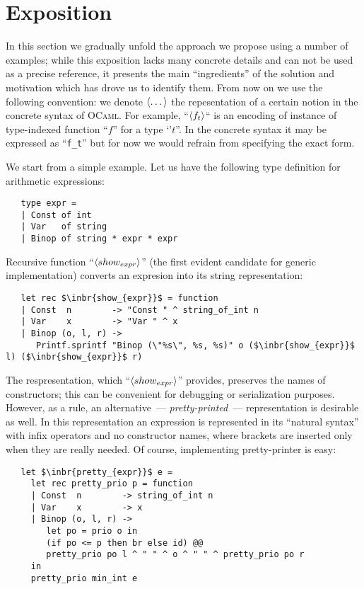\section{Exposition}

In this section we gradually unfold the approach we propose using a number of examples; while this exposition lacks many concrete details and can not be used as a
precise reference, it presents the main ``ingredients'' of the solution and motivation which has drove us to identify them. From now on we use the following
convention: we denote $\left<\dots\right>$ the repesentation of a certain notion in the concrete syntax of \textsc{OCaml}. For example, ``$\left<f_t\right>$`` is an encoding of instance
of type-indexed function ``$f$'' for a type `'$t$''. In the concrete syntax it may be expressed as ``\lstinline{f_t}'' but for now we would refrain from specifying
the exact form.

We start from a simple example. Let us have the following type definition for arithmetic expressions:

\begin{lstlisting}
   type expr =
   | Const of int
   | Var   of string
   | Binop of string * expr * expr
\end{lstlisting}

Recursive function ``$\left<show_{expr}\right>$'' (the first evident candidate for generic implementation) converts an expresion into its string representation:

\begin{lstlisting}
   let rec $\inbr{show_{expr}}$ = function
   | Const  n        -> "Const " ^ string_of_int n
   | Var    x        -> "Var " ^ x
   | Binop (o, l, r) ->
      Printf.sprintf "Binop (\"%s\", %s, %s)" o ($\inbr{show_{expr}}$ l) ($\inbr{show_{expr}}$ r)
\end{lstlisting}

The respresentation, which ``$\left<show_{expr}\right>$'' provides, preserves the names of constructors; this can be convenient for debugging or
serialization purposes. However, as a rule, an alternative~--- \emph{pretty-printed}~--- representation is desirable as well. In this
representation an expression is represented in its ``natural syntax'' with infix operators and no constructor names, where brackets are
inserted only when they are really needed. Of course, implementing pretty-printer is easy:

\begin{lstlisting}
   let $\inbr{pretty_{expr}}$ e =
     let rec pretty_prio p = function
     | Const  n        -> string_of_int n
     | Var    x        -> x
     | Binop (o, l, r) ->
        let po = prio o in
        (if po <= p then br else id) @@
        pretty_prio po l ^ " " ^ o ^ " " ^ pretty_prio po r
     in
     pretty_prio min_int e
\end{lstlisting}

